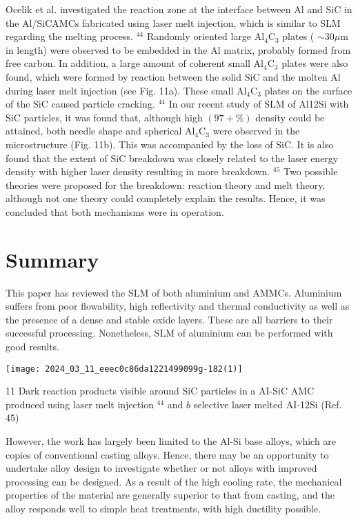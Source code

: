 \documentclass[10pt]{article}
\begin{document}
Ocelik et al. investigated the reaction zone at the interface between $\mathrm{Al}$ and $\mathrm{SiC}$ in the $\mathrm{Al} / \mathrm{SiC} \mathrm{AMCs}$ fabricated using laser melt injection, which is similar to SLM regarding the melting process. ${ }^{44}$ Randomly oriented large $\mathrm{Al}_{4} \mathrm{C}_{3}$ plates ( $\sim 30 \mu \mathrm{m}$ in length) were observed to be embedded in the Al matrix, probably formed from free carbon. In addition, a large amount of coherent small $\mathrm{Al}_{4} \mathrm{C}_{3}$ plates were also found, which were formed by reaction between the solid $\mathrm{SiC}$ and the molten $\mathrm{Al}$ during laser melt injection (see Fig. 11a). These small $\mathrm{Al}_{4} \mathrm{C}_{3}$ plates on the surface of the $\mathrm{SiC}$ caused particle cracking. ${ }^{44}$ In our recent study of SLM of Al12Si with $\mathrm{SiC}$ particles, it was found that, although high $(97+\%)$ density could be attained, both needle shape and spherical $\mathrm{Al}_{4} \mathrm{C}_{3}$ were observed in the microstructure (Fig. 11b). This was accompanied by the loss of SiC. It is also found that the extent of $\mathrm{SiC}$ breakdown was closely related to the laser energy density with higher laser density resulting in more breakdown. ${ }^{45}$ Two possible theories were proposed for the breakdown: reaction theory and melt theory, although not one theory could completely explain the results. Hence, it was concluded that both mechanisms were in operation.

\section*{Summary}
This paper has reviewed the SLM of both aluminium and AMMCs. Aluminium suffers from poor flowability, high reflectivity and thermal conductivity as well as the presence of a dense and stable oxide layers. These are all barriers to their successful processing. Nonetheless, SLM of aluminium can be performed with good results.

\begin{center}
\texttt{[image: 2024\_03\_11\_eeec0c86da1221499099g-182(1)]}
\end{center}

11 Dark reaction products visible around $\mathrm{SiC}$ particles in a AI-SiC AMC produced using laser melt injection ${ }^{44}$ and $b$ selective laser melted AI-12Si (Ref. 45)

However, the work has largely been limited to the Al-Si base alloys, which are copies of conventional casting alloys. Hence, there may be an opportunity to undertake alloy design to investigate whether or not alloys with improved processing can be designed. As a result of the high cooling rate, the mechanical properties of the material are generally superior to that from casting, and the alloy responds well to simple heat treatments, with high ductility possible.
\end{document}
